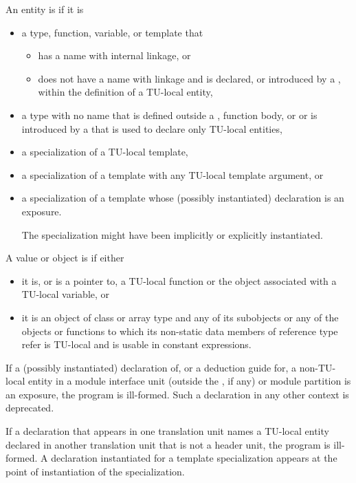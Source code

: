 \pnum
An entity is  if it is
\begin{itemize}
\item
a type, function, variable, or template that
\begin{itemize}
\item
has a name with internal linkage, or
\item
does not have a name with linkage and is declared,
or introduced by a ,
within the definition of a TU-local entity,
\end{itemize}
\item
a type with no name that is defined outside a
,
function body, or
or is introduced by a 
that is used to declare only TU-local entities,
\item
a specialization of a TU-local template,
\item
a specialization of a template with any TU-local template argument, or
\item
a specialization of a template
whose (possibly instantiated) declaration is an exposure.
\begin{note}
The specialization might have been implicitly or explicitly instantiated.
\end{note}
\end{itemize}

\pnum
A value or object is  if either
\begin{itemize}
\item
it is, or is a pointer to,
a TU-local function or the object associated with a TU-local variable, or
\item
it is an object of class or array type and
any of its subobjects or
any of the objects or functions
to which its non-static data members of reference type refer
is TU-local and is usable in constant expressions.
\end{itemize}

\pnum
If a (possibly instantiated) declaration of, or a deduction guide for,
a non-TU-local entity in a module interface unit
(outside the , if any) or
module partition is an exposure,
the program is ill-formed.
Such a declaration in any other context is deprecated.

\pnum
If a declaration that appears in one translation unit
names a TU-local entity declared
in another translation unit that is not a header unit,
the program is ill-formed.
A declaration instantiated for a template specialization
appears at the point of instantiation of the specialization.

